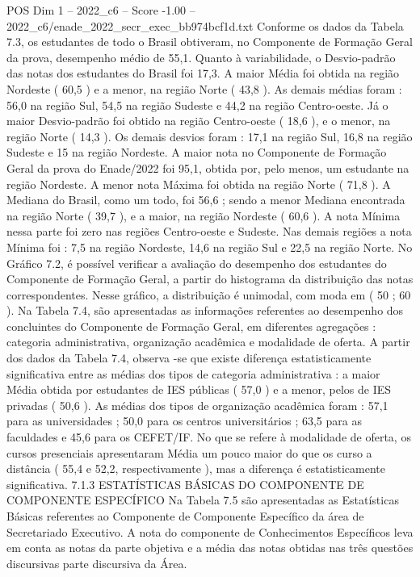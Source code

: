 \begin{textsample}{POS Dim 1 – 2022\_c6 – Score -1.00 – 2022\_c6/enade\_2022\_secr\_exec\_bb974bcf1d.txt}
Conforme os dados da Tabela 7.3, os estudantes de todo o Brasil obtiveram, no Componente de Formação Geral da prova, desempenho médio de 55,1.
Quanto à variabilidade, o Desvio-padrão das notas dos estudantes do Brasil foi 17,3.
A maior Média foi obtida na região Nordeste ( 60,5 ) e a menor, na região Norte ( 43,8 ).
As demais médias foram : 56,0 na região Sul, 54,5 na região Sudeste e 44,2 na região Centro-oeste.
Já o maior Desvio-padrão foi obtido na região Centro-oeste ( 18,6 ), e o menor, na região Norte ( 14,3 ).
Os demais desvios foram : 17,1 na região Sul, 16,8 na região Sudeste e 15 na região Nordeste.
A maior nota no Componente de Formação Geral da prova do Enade/2022 foi 95,1, obtida por, pelo menos, um estudante na região Nordeste.
A menor nota Máxima foi obtida na região Norte ( 71,8 ).
A Mediana do Brasil, como um todo, foi 56,6 ; sendo a menor Mediana encontrada na região Norte ( 39,7 ), e a maior, na região Nordeste ( 60,6 ).
A nota Mínima nessa parte foi zero nas regiões Centro-oeste e Sudeste.
Nas demais regiões a nota Mínima foi : 7,5 na região Nordeste, 14,6 na região Sul e 22,5 na região Norte.
No Gráfico 7.2, é possível verificar a avaliação do desempenho dos estudantes do Componente de Formação Geral, a partir do histograma da distribuição das notas correspondentes.
Nesse gráfico, a distribuição é unimodal, com moda em ( 50 ; 60 ).
Na Tabela 7.4, são apresentadas as informações referentes ao desempenho dos concluintes do Componente de Formação Geral, em diferentes agregações : categoria administrativa, organização acadêmica e modalidade de oferta.
A partir dos dados da Tabela 7.4, observa -se que existe diferença estatisticamente significativa entre as médias dos tipos de categoria administrativa : a maior Média obtida por estudantes de IES públicas ( 57,0 ) e a menor, pelos de IES privadas ( 50,6 ).
As médias dos tipos de organização acadêmica foram : 57,1 para as universidades ; 50,0 para os centros universitários ; 63,5 para as faculdades e 45,6 para os CEFET/IF.
No que se refere à modalidade de oferta, os cursos presenciais apresentaram Média um pouco maior do que os curso a distância ( 55,4 e 52,2, respectivamente ), mas a diferença é estatisticamente significativa. 7.1.3 ESTATÍSTICAS BÁSICAS DO COMPONENTE DE COMPONENTE ESPECÍFICO Na Tabela 7.5 são apresentadas as Estatísticas Básicas referentes ao Componente de Componente Específico da área de Secretariado Executivo.
A nota do componente de Conhecimentos Específicos leva em conta as notas da parte objetiva e a média das notas obtidas nas três questões discursivas parte discursiva da Área.

\end{textsample}
